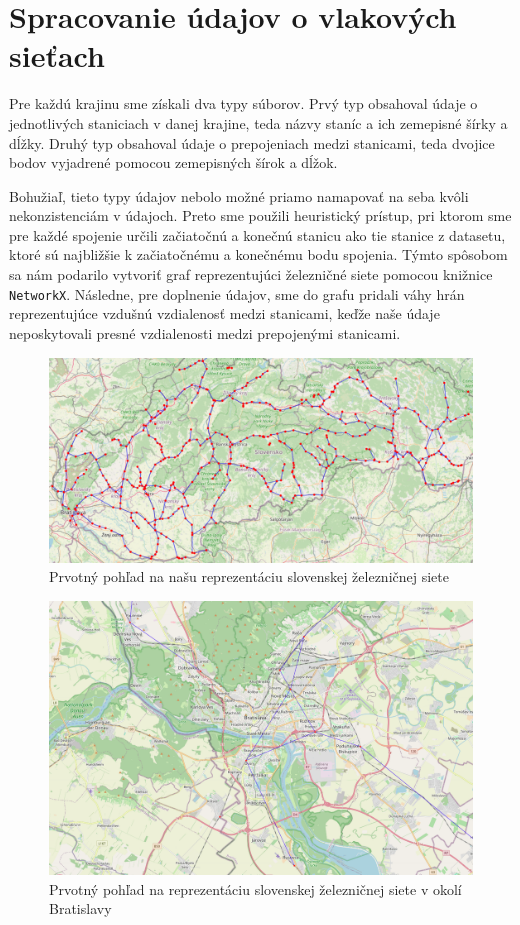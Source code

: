 \documentclass[main.tex]{subfiles}
\begin{document}
	
\section{Spracovanie údajov o vlakových sieťach}

Pre každú krajinu sme získali dva typy súborov. Prvý typ obsahoval údaje o jednotlivých staniciach v danej krajine, teda názvy staníc a ich zemepisné šírky a dĺžky. Druhý typ obsahoval údaje o prepojeniach medzi stanicami, teda dvojice bodov vyjadrené pomocou zemepisných šírok a dĺžok.

Bohužiaľ, tieto typy údajov nebolo možné priamo namapovať na seba kvôli nekonzistenciám v údajoch. Preto sme použili heuristický prístup, pri ktorom sme pre každé spojenie určili začiatočnú a konečnú stanicu ako tie stanice z datasetu, ktoré sú najbližšie k začiatočnému a konečnému bodu spojenia. Týmto spôsobom sa nám podarilo vytvoriť graf reprezentujúci železničné siete pomocou knižnice \texttt{NetworkX}. Následne, pre doplnenie údajov, sme do grafu pridali váhy hrán reprezentujúce vzdušnú vzdialenosť medzi stanicami, keďže naše údaje neposkytovali presné vzdialenosti medzi prepojenými stanicami.

\begin{figure}
\centerline{\includegraphics[width=1\textwidth]{images/first_attempt_slovakia.png}}
\caption{Prvotný pohľad na našu reprezentáciu slovenskej železničnej siete}
\label{obr:Slovakia_first}
\end{figure}

\begin{figure}
\centerline{\includegraphics[width=1\textwidth]{images/first_attempt_bratislava.png}}
\caption{Prvotný pohľad na reprezentáciu slovenskej železničnej siete v okolí Bratislavy}
\label{obr:Bratislava_first}
\end{figure}
\end{document}
